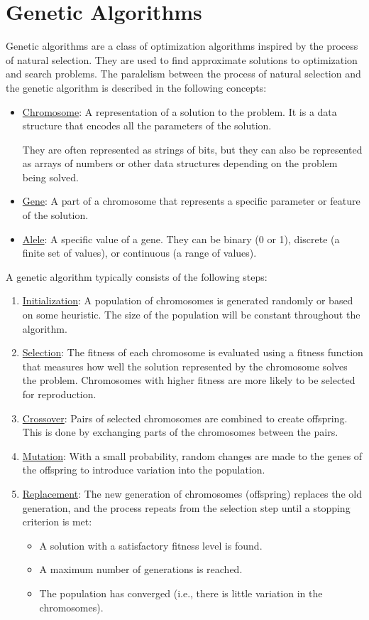 \chapter{Genetic Algorithms}

Genetic algorithms are a class of optimization algorithms inspired by the process of natural selection. They are used to find approximate solutions to optimization and search problems. The paralelism between the process of natural selection and the genetic algorithm is described in the following concepts:
\begin{itemize}
    \item \ul{Chromosome}: A representation of a solution to the problem. It is a data structure that encodes all the parameters of the solution.
    
    They are often represented as strings of bits, but they can also be represented as arrays of numbers or other data structures depending on the problem being solved.

    \item \ul{Gene}: A part of a chromosome that represents a specific parameter or feature of the solution.
    \item \ul{Alele}: A specific value of a gene. They can be binary (0 or 1), discrete (a finite set of values), or continuous (a range of values).
\end{itemize}

A genetic algorithm typically consists of the following steps:
\begin{enumerate}
    \item \ul{Initialization}: A population of chromosomes is generated randomly or based on some heuristic. The size of the population will be constant throughout the algorithm.
    \item \ul{Selection}: The fitness of each chromosome is evaluated using a fitness function that measures how well the solution represented by the chromosome solves the problem. Chromosomes with higher fitness are more likely to be selected for reproduction.
    \item \ul{Crossover}: Pairs of selected chromosomes are combined to create offspring. This is done by exchanging parts of the chromosomes between the pairs.
    \item \ul{Mutation}: With a small probability, random changes are made to the genes of the offspring to introduce variation into the population.
    \item \ul{Replacement}: The new generation of chromosomes (offspring) replaces the old generation, and the process repeats from the selection step until a stopping criterion is met:
    \begin{itemize}
        \item A solution with a satisfactory fitness level is found.
        \item A maximum number of generations is reached.
        \item The population has converged (i.e., there is little variation in the chromosomes).
    \end{itemize}
\end{enumerate}

